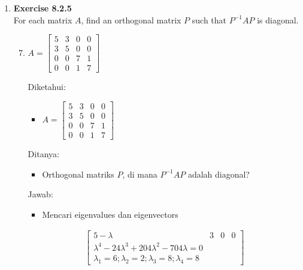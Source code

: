 \documentclass[12pt, a4paper]{scrartcl}
\begin{document}
\begin{enumerate}
            \item \textbf{Exercise 8.2.5}\\For each matrix $A$, find an orthogonal matrix $P$ such that $P^{-1}AP$ is diagonal.
            \begin{enumerate}
                \setcounter{enumii}{6}
                \item $A = \begin{bmatrix}
                    5&3&0&0\\
                    3&5&0&0\\
                    0&0&7&1\\
                    0&0&1&7
                \end{bmatrix}$

                Diketahui:
                \begin{itemize}
                    \item[] $A = \begin{bmatrix}
                        5 & 3 & 0 & 0
                        \\ 3 & 5 & 0 & 0
                        \\ 0 & 0 & 7 & 1
                        \\ 0 & 0 & 1 & 7
                    \end{bmatrix}$
                \end{itemize}

                Ditanya:
                \begin{itemize}
                    \item Orthogonal matriks $P$, di mana $P^{-1}AP$ adalah diagonal?
                \end{itemize}

                Jawab:
                \begin{itemize}
                    \item[] Mencari eigenvalues dan eigenvectors
                \end{itemize}
                \begin{align*}
                    \begin{bmatrix}
                        5-\lambda & 3 & 0 & 0
                        \\ \lambda^4 - 24\lambda^3 + 204\lambda^2 - 704\lambda = 0
                        \\ \lambda_1 = 6; \lambda_2 = 2; \lambda_3 = 8; \lambda_4 = 8
                    \end{bmatrix}
                \end{align*}


\end{enumerate}
\end{enumerate}
\end{document}
